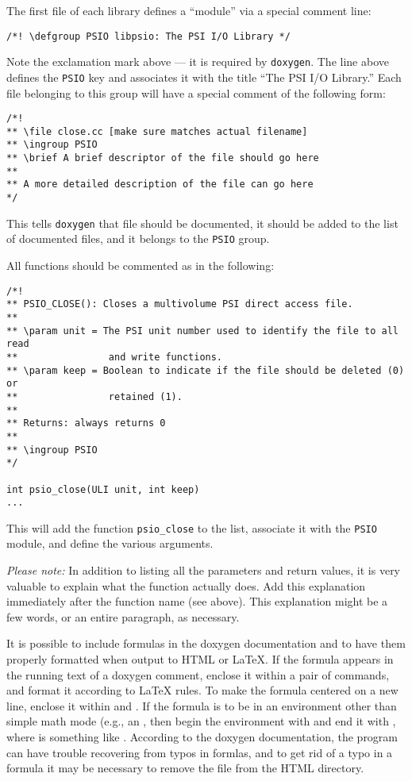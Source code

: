 The first file of each library defines a ``module'' via a special
comment line:
\begin{verbatim}
/*! \defgroup PSIO libpsio: The PSI I/O Library */
\end{verbatim}
Note the exclamation mark above --- it is required by {\tt doxygen}.
The line above defines the {\tt PSIO} key and associates it with the
title ``The PSI I/O Library.'' Each file belonging to this group will
have a special comment of the following form:
\begin{verbatim}
/*!
** \file close.cc [make sure matches actual filename]
** \ingroup PSIO
** \brief A brief descriptor of the file should go here
**
** A more detailed description of the file can go here
*/
\end{verbatim}
This tells {\tt doxygen} that file  should be
documented, it should be added to the list of documented files, and it
belongs to the {\tt PSIO} group.

All functions should be commented as in the following:
\begin{verbatim}
/*!
** PSIO_CLOSE(): Closes a multivolume PSI direct access file.
**
** \param unit = The PSI unit number used to identify the file to all read
**                and write functions.
** \param keep = Boolean to indicate if the file should be deleted (0) or
**                retained (1).
**
** Returns: always returns 0
**
** \ingroup PSIO
*/

int psio_close(ULI unit, int keep)
...
\end{verbatim}
This will add the function {\tt psio\_close} to the list, associate it with
the {\tt PSIO} module, and define the various arguments.

{\em Please note:} In addition to listing all the parameters and return
values, it is very valuable to explain what the function actually does.
Add this explanation immediately after the function name (see above).  This
explanation might be a few words, or an entire paragraph, as necessary.

It is possible to include formulas in the doxygen documentation
and to have them properly formatted when output to HTML or LaTeX.
If the formula appears in the running text of a doxygen comment,
enclose it within a pair of  commands,
and format it according to LaTeX rules.  To make the formula
centered on a new line, enclose it within \celem{$\backslash$f[} and
\celem{$\backslash$f]}.  If the formula is to be in an environment
other than simple math mode (e.g., an , then begin
the environment with  and end it
with , where  is something
like .  According to the doxygen documentation,
the program can have trouble recovering from typos in formlas, and to
get rid of a typo in a formula it may be necessary to remove the file
 from the HTML directory.


